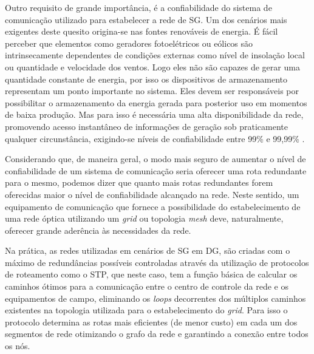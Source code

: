 \documentclass[12pt]{article}
\begin{document}
Outro requisito de grande importância, é a confiabilidade do sistema de comunicação utilizado para estabelecer a rede de SG. Um dos cenários mais exigentes deste quesito origina-se nas fontes renováveis de energia. É fácil perceber que elementos como geradores fotoelétricos ou eólicos são intrinsecamente dependentes de condições externas como nível de insolação local ou quantidade e velocidade dos ventos. Logo eles não são capazes de gerar uma quantidade constante de energia, por isso os dispositivos de armazenamento representam um ponto importante no sistema. Eles devem ser responsáveis por possibilitar o armazenamento da energia gerada para posterior uso em momentos de baixa produção. Mas para isso é necessária uma alta disponibilidade da rede, promovendo acesso instantâneo de informações de geração sob praticamente qualquer circunstância, exigindo-se níveis de confiabilidade entre 99\% e 99,99\% \cite{Art_Gungor2013}.

Considerando que, de maneira geral, o modo mais seguro de aumentar o nível de confiabilidade de um sistema de comunicação seria oferecer uma rota redundante para o mesmo, podemos dizer que quanto mais rotas redundantes forem oferecidas maior o nível de confiabilidade alcançado na rede. Neste sentido, um equipamento de comunicação que fornece a possibilidade do estabelecimento de uma rede óptica utilizando um \emph{grid} ou topologia \emph{mesh} deve, naturalmente, oferecer grande aderência às necessidades da rede.

Na prática, as redes utilizadas em cenários de SG em DG, são criadas com o máximo de redundâncias possíveis controladas através da utilização de protocolos de roteamento como o STP, que neste caso, tem a função básica de calcular os caminhos ótimos para a comunicação entre o centro de controle da rede e os equipamentos de campo, eliminando os \emph{loops} decorrentes dos múltiplos caminhos existentes na topologia utilizada para o estabelecimento do \emph{grid}. Para isso o protocolo determina as rotas mais eficientes (de menor custo) em cada um dos segmentos de rede otimizando o grafo da rede e garantindo a conexão entre todos os nós.
\end{document}
